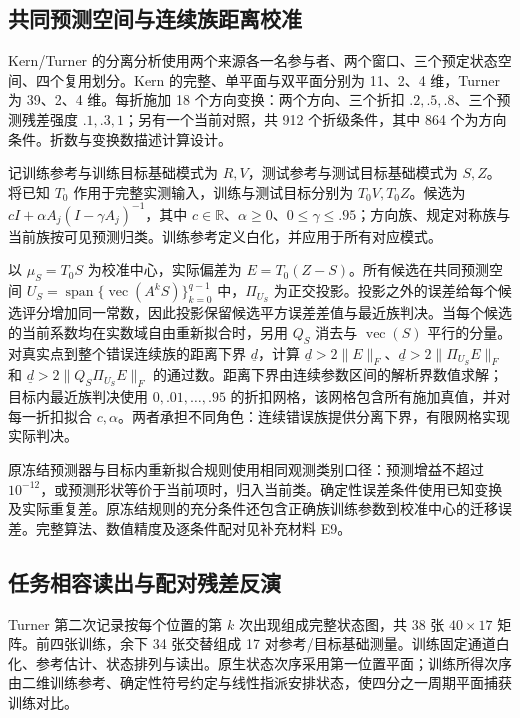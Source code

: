 \documentclass[11pt,a4paper]{article}
\begin{document}
\subsection{共同预测空间与连续族距离校准}\label{ux5171ux540cux9884ux6d4bux7a7aux95f4ux4e0eux8fdeux7eedux65cfux8dddux79bbux6821ux51c6}

Kern/Turner
的分离分析使用两个来源各一名参与者、两个窗口、三个预定状态空间、四个复用划分。Kern
的完整、单平面与双平面分别为 11、2、4 维，Turner 为 39、2、4
维。每折施加 18 个方向变换：两个方向、三个折扣
\(.2,.5,.8\)、三个预测残差强度 \(.1,.3,1\)；另有一个当前对照，共 912
个折级条件，其中 864 个为方向条件。折数与变换数描述计算设计。

记训练参考与训练目标基础模式为 \(R,V\)，测试参考与测试目标基础模式为
\(S,Z\)。将已知 \(T_0\) 作用于完整实测输入，训练与测试目标分别为
\(T_0V,T_0Z\)。候选为 \(cI+\alpha A_j(I-\gamma A_j)^{-1}\)，其中
\(c\in\mathbb R\)、\(\alpha\geq0\)、\(0\leq\gamma\leq.95\)；方向族、规定对称族与当前族按可见预测归类。训练参考定义白化，并应用于所有对应模式。

以 \(\mu_S=T_0S\) 为校准中心，实际偏差为
\(E=T_0(Z-S)\)。所有候选在共同预测空间
\(U_S=\operatorname{span}\{\operatorname{vec}(A^kS)\}_{k=0}^{q-1}\)
中，\(\Pi_{U_S}\)
为正交投影。投影之外的误差给每个候选评分增加同一常数，因此投影保留候选平方误差差值与最近族判决。当每个候选的当前系数均在实数域自由重新拟合时，另用
\(Q_S\) 消去与 \(\operatorname{vec}(S)\)
平行的分量。对真实点到整个错误连续族的距离下界 \(\underline d\)，计算
\(\underline d>2\|E\|_F\)、\(\underline d>2\|\Pi_{U_S}E\|_F\) 和
\(\underline d>2\|Q_S\Pi_{U_S}E\|_F\)
的通过数。距离下界由连续参数区间的解析界数值求解；目标内最近族判决使用
\(0,.01,\ldots,.95\)
的折扣网格，该网格包含所有施加真值，并对每一折扣拟合
\(c,\alpha\)。两者承担不同角色：连续错误族提供分离下界，有限网格实现实际判决。

原冻结预测器与目标内重新拟合规则使用相同观测类别口径：预测增益不超过
\(10^{-12}\)，或预测形状等价于当前项时，归入当前类。确定性误差条件使用已知变换及实际重复差。原冻结规则的充分条件还包含正确族训练参数到校准中心的迁移误差。完整算法、数值精度及逐条件配对见补充材料
E9。

\subsection{任务相容读出与配对残差反演}\label{ux4efbux52a1ux76f8ux5bb9ux8bfbux51faux4e0eux914dux5bf9ux6b8bux5deeux53cdux6f14}

Turner 第二次记录按每个位置的第 \(k\) 次出现组成完整状态图，共 38 张
\(40\times17\) 矩阵。前四张训练，余下 34 张交替组成 17
对参考/目标基础测量。训练固定通道白化、参考估计、状态排列与读出。原生状态次序采用第一位置平面；训练所得次序由二维训练参考、确定性符号约定与线性指派安排状态，使四分之一周期平面捕获训练对比。
\end{document}

